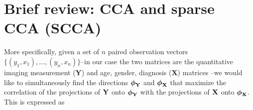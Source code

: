 \documentclass{llncs}
\newcommand{\X}{{\bf X}}
\newcommand{\Y}{{\bf Y}}
\newcommand{\y}{{\bf y}}
\newcommand{\bs}{\boldsymbol}
\begin{document}



\section{Brief review: CCA and sparse CCA (SCCA)}

More specifically, given a set of $n$ paired observation vectors
$\{(y_1,x_1),...,(y_n,x_n)\}$--in our case the two matrices are the
quantitative imaging measurement ({\Y}) and age, gender, diagnosis ({\X}) matrices --we would like to simultaneously find the directions
${\bs{\bs\phi_{\Y}}}$ and
${\bs{\bs\phi_{\X}}}$ that maximize the correlation of
the projections of ${\Y}$ onto ${\bs{\bs\phi_{\Y}}}$
with the projections of ${\X}$ onto
${\bs{\bs\phi_{\X}}}$. This is expressed as
\end{document}
